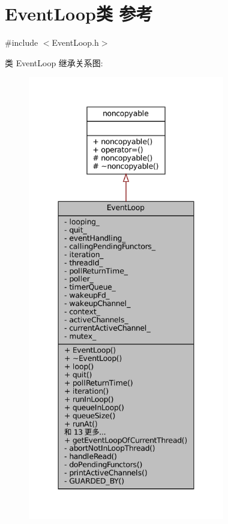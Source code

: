 \hypertarget{classmuduo_1_1net_1_1EventLoop}{}\section{Event\+Loop类 参考}
\label{classmuduo_1_1net_1_1EventLoop}


{\ttfamily \#include $<$Event\+Loop.\+h$>$}



类 Event\+Loop 继承关系图\+:
\nopagebreak
\begin{figure}[H]
\begin{center}
\leavevmode
\includegraphics[height=550pt]{classmuduo_1_1net_1_1EventLoop__inherit__graph}
\end{center}
\end{figure}


